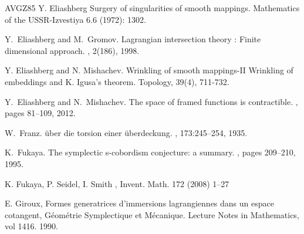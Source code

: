 \documentclass{amsart}
\theoremstyle{definition}
\theoremstyle{remark}
\newtheorem{inductive lemma}[theorem]{Inductive Lemma}
\begin{document}
\begin{thebibliography}{AVGZ85}
  Y. Eliashberg
  \newblock Surgery of singularities of smooth mappings.
  \newblock Mathematics of the USSR-Izvestiya 6.6 (1972): 1302.

Y.~Eliashberg and M.~Gromov.
\newblock Lagrangian intersection theory : Finite dimensional approach.
, 2(186), 1998.

  
  Y. Eliashberg and N. Mishachev.
  \newblock Wrinkling of smooth mappings-II Wrinkling of embeddings and K. Igusa’s theorem. 
  \newblock Topology, 39(4), 711-732.


Y.~Eliashberg and N.~Mishachev.
\newblock The space of framed functions is contractible.
, pages
  81--109, 2012.
  




W.~Franz.
\newblock \"uber die torsion einer \"uberdeckung.
, 173:245--254, 1935.

K.~Fukaya.
\newblock The symplectic s-cobordism conjecture: a summary.
, pages 209--210, 1995.

K. Fukaya, P. Seidel, I. Smith
, 
Invent. Math. 172 (2008) 1–27

  E. Giroux, Formes generatrices d’immersions lagrangiennes dans un espace cotangent, G\'eom\'etrie Symplectique et M\'ecanique. Lecture Notes in Mathematics, vol 1416. 1990.
    


\end{thebibliography}
\end{document}

